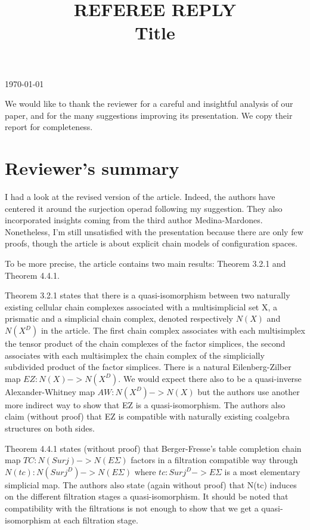 \documentclass{amsart}
\title[Referee reply]{REFEREE REPLY \\ Title}
\begin{document}
	\noindent\today
	\maketitle

	We would like to thank the reviewer for a careful and insightful analysis of our paper, and for the many suggestions improving its presentation.
	We copy their report for completeness.

	\section{Reviewer's summary}

	I had a look at the revised version of the article.
	Indeed, the authors have centered it around the surjection operad following my suggestion.
	They also incorporated insights coming from the third author Medina-Mardones.
	Nonetheless, I'm still unsatisfied with the presentation because there are only few proofs, though the article is about explicit chain models of configuration spaces.

	To be more precise, the article contains two main results: Theorem 3.2.1 and Theorem 4.4.1.

	Theorem 3.2.1 states that there is a quasi-isomorphism between two naturally existing cellular chain complexes associated with a multisimplicial set X, a prismatic and a simplicial chain complex, denoted respectively $N(X)$ and $N(X^D)$ in the article.
	The first chain complex associates with each multisimplex the tensor product of the chain complexes of the factor simplices, the second associates with each multisimplex the chain complex of the simplicially subdivided product of the factor simplices.
	There is a natural Eilenberg-Zilber map $EZ:N(X)->N(X^D)$.
	We would expect there also to be a quasi-inverse Alexander-Whitney map $AW:N(X^D)->N(X)$ but the authors use another more indirect way to show that EZ is a quasi-isomorphism.
	The authors also claim (without proof) that EZ is compatible with naturally existing coalgebra structures on both sides.

	Theorem 4.4.1 states (without proof) that Berger-Fresse's table completion chain map $TC:N(Surj)->N(E\Sigma)$ factors in a filtration compatible way through $N(tc):N(Surj^D)->N(E\Sigma)$ where $tc:Surj^D->E\Sigma$ is a most elementary simplicial map.
	The authors also state (again without proof) that N(tc) induces on the different filtration stages a quasi-isomorphism.
	It should be noted that compatibility with the filtrations is not enough to show that we get a quasi-isomorphism at each filtration stage.
\end{document}
